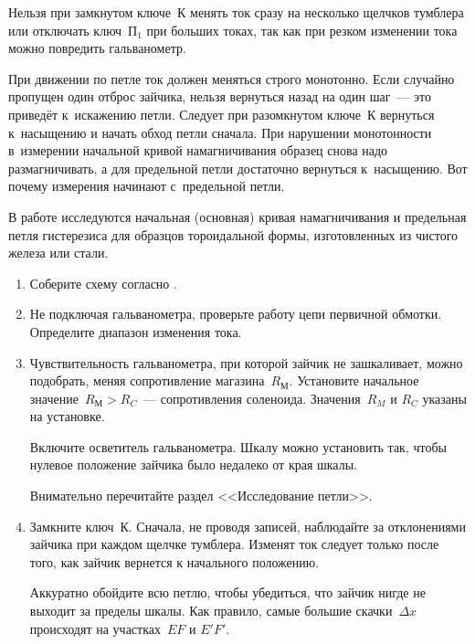 Нельзя при замкнутом ключе~К менять ток сразу на несколько щелчков тумблера или отключать ключ~$П_1$ при больших
токах, так как при резком изменении тока можно повредить гальванометр.

При движении по петле ток должен меняться строго монотонно. Если случайно пропущен один отброс зайчика, нельзя вернуться
назад на один шаг~--- это приведёт к~искажению петли. Следует при разомкнутом ключе~$К$ вернуться к~насыщению и начать
обход петли сначала. При нарушении монотонности в~измерении начальной кривой намагничивания образец снова надо
размагничивать, а для предельной петли достаточно вернуться к~насыщению. Вот почему измерения начинают с~предельной
петли.

\begin{lab:task}

	
	В работе исследуются начальная (основная) кривая намагничивания и предельная петля гистерезиса для образцов тороидальной
	формы, изготовленных из чистого железа или стали.
	
	\begin{enumerate}
		

	\item Соберите схему согласно .
	
	\item Не подключая гальванометра, проверьте работу цепи первичной обмотки. Определите диапазон изменения тока.
	
	\item Чувствительность гальванометра, при которой зайчик не зашкаливает, можно подобрать, меняя сопротивление
	магазина~$R_М$. Установите начальное значение~$R_М>R_C$~--- сопротивления соленоида. Значения~$R_M$ и $R_C$ указаны на
	установке.
	
	Включите осветитель гальванометра. Шкалу можно установить так, чтобы нулевое положение зайчика было недалеко от края
	шкалы.
	
	\begin{lab:warning}
		Внимательно перечитайте раздел <<Исследование петли>>.
	\end{lab:warning}
	
	\item Замкните ключ~$К$. Сначала, не проводя записей, наблюдайте за отклонениями зайчика при каждом щелчке тумблера. Изменят ток следует только после того, как зайчик вернется к начального положению.
	
	Аккуратно обойдите всю петлю, чтобы убедиться, что зайчик нигде не выходит за пределы шкалы. Как правило, самые большие
	скачки~$\Delta x$ происходят на участках~$EF$ и $E'F'$.
	

\end{enumerate}
\end{lab:task}

